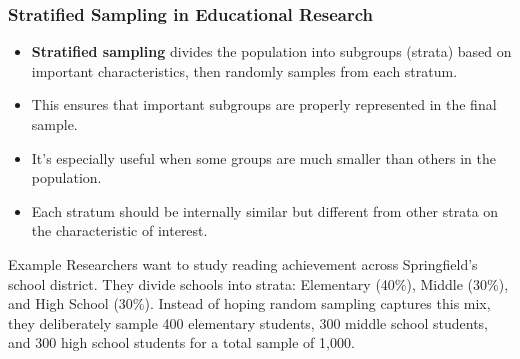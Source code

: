 \documentclass{beamer}
\begin{document}
	\begin{frame}
		\frametitle{Stratified Sampling in Educational Research}
		
		\begin{itemize}
			\item \textbf{Stratified sampling} divides the population into subgroups (strata) based on important characteristics, then randomly samples from each stratum.
			\item This ensures that important subgroups are properly represented in the final sample.
			\item It's especially useful when some groups are much smaller than others in the population.
			\item Each stratum should be internally similar but different from other strata on the characteristic of interest.
		\end{itemize}
		
		\begin{exampleblock}{Example}
			Researchers want to study reading achievement across Springfield's school district. They divide schools into strata: Elementary (40\%), Middle (30\%), and High School (30\%). Instead of hoping random sampling captures this mix, they deliberately sample 400 elementary students, 300 middle school students, and 300 high school students for a total sample of 1,000.
		\end{exampleblock}
		
	\end{frame}	
	
	
\end{document}
